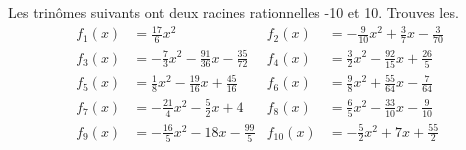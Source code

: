   \begin{exercice}\label{exo201}
 Les trinômes suivants ont deux racines rationnelles -10 et 10. Trouves les.\begin{align*}
f_{1}(x)&=\frac{17}{6}x^2&f_{2}(x)&=-\frac{9}{10}x^2+\frac{3}{7}x-\frac{3}{70}\\
f_{3}(x)&=-\frac{7}{3}x^2-\frac{91}{36}x-\frac{35}{72}&f_{4}(x)&=\frac{3}{2}x^2-\frac{92}{15}x+\frac{26}{5}\\
f_{5}(x)&=\frac{1}{8}x^2-\frac{19}{16}x+\frac{45}{16}&f_{6}(x)&=\frac{9}{8}x^2+\frac{55}{64}x-\frac{7}{64}\\
f_{7}(x)&=-\frac{21}{4}x^2-\frac{5}{2}x+4&f_{8}(x)&=\frac{6}{5}x^2-\frac{33}{10}x-\frac{9}{10}\\
f_{9}(x)&=-\frac{16}{5}x^2-18x-\frac{99}{5}&f_{10}(x)&=-\frac{5}{2}x^2+7x+\frac{55}{2}
\end{align*}
\end{exercice}%


